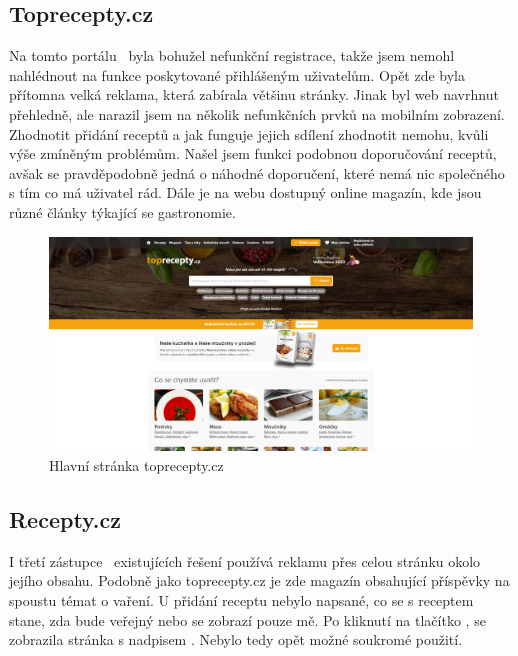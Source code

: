 \subsection{Toprecepty.cz}

Na tomto portálu~\cite{TopreceptyCZ} byla bohužel nefunkční registrace, takže jsem nemohl nahlédnout na funkce poskytované přihlášeným
uživatelům. Opět zde byla přítomna velká reklama, která zabírala většinu stránky. Jinak byl web navrhnut přehledně,
ale narazil jsem na několik nefunkčních prvků na mobilním zobrazení. Zhodnotit přidání receptů a jak funguje jejich
sdílení zhodnotit nemohu, kvůli výše zmíněným problémům. Našel jsem funkci podobnou doporučování receptů, avšak se
pravděpodobně jedná o náhodné doporučení, které nemá nic společného s tím co má uživatel rád. Dále je na webu dostupný
online magazín, kde jsou různé články týkající se gastronomie.

\begin{figure}[h]
    \includegraphics[width=\textwidth]{images/topreceptycz-uvodni-stranka}
    \caption{Hlavní stránka toprecepty.cz} \label{picture:topreceptycz:uvodni-stranka}
\end{figure}

\subsection{Recepty.cz}

I třetí zástupce~\cite{ReceptyCZ} existujících řešení používá reklamu přes celou stránku okolo jejího obsahu. Podobně jako toprecepty.cz
je zde magazín obsahující příspěvky na spoustu témat o vaření. U přidání receptu nebylo napsané, co se s receptem stane,
zda bude veřejný nebo se zobrazí pouze mě. Po kliknutí na tlačítko , se zobrazila stránka s nadpisem
. Nebylo tedy opět možné soukromé použití.


